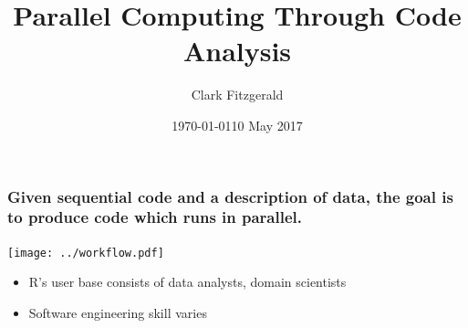 \documentclass{beamer}
\begin{document}
\title{Parallel Computing Through Code Analysis}
\date{\today}
\date{10 May 2017}
\author{Clark Fitzgerald}

\frame{\titlepage}


\begin{frame}

    \frametitle{Given sequential code and a description of data, the goal is to
    produce code which runs in parallel.}

\centerline{\texttt{[image: ../workflow.pdf]}}

\pause 

    \begin{itemize}
        \item R's user base consists of data analysts, domain scientists 
        \item Software engineering skill varies
    \end{itemize}

\end{frame}
\end{document}
